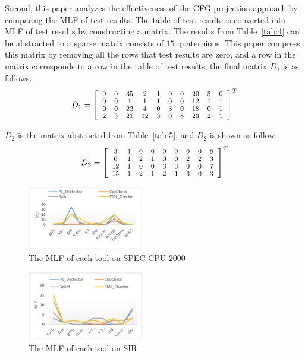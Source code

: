 Second, this paper analyzes the effectiveness of the CFG projection approach by comparing the MLF of test results. The table of test  results is converted into MLF of test results by constructing a matrix. The results from Table~\ref{tab:4} can be abstracted to a sparse matrix consists of $15$ quaternions. This paper compress this matrix by removing all the rows that test results are zero, and a row in the matrix corresponds to a row in the table of test results, the final matrix $D_1$ is as follows.
\[
\scriptsize
D_1=\left[
\begin{array}{cccccccccc}
0 & 0 & 35 & 2 & 1 & 0 & 0 & 20 & 3 & 0\\
0 & 0 & 1  &  1 & 1 & 0 & 0 & 12 & 1 & 1\\
0 & 0 & 22 & 4 & 0 & 3 & 0 & 18 & 0 & 1 \\
2 & 3 & 21 & 12 & 3& 0 & 8 & 20 & 2 & 1  
\end{array}
\right]^{T}
\]

$D_2$ is the matrix abstracted from Table~\ref{tab:5}, and $D_2$ is shown as follow:
\[
\scriptsize
D_2=\left[
\begin{array}{ccccccccc}
3 & 1 & 0 & 0 & 0 & 0 & 0 & 0 & 8 \\
6 & 1 & 2 &  1 & 0 & 0 & 2 & 2 & 3\\
12 & 1 & 0 & 0 & 3 & 3 & 0 & 0 & 7 \\
15 & 1 & 2& 1 & 2 & 1 & 3 & 0 & 3  
\end{array}
\right]^{T}
\]

\begin{figure}[!h]
\center
\includegraphics[width=0.45\textwidth]{figure/fig8-fig12/fig10}
\caption{The MLF of each tool on SPEC CPU 2000}
\label{fig:10}
\end{figure}

\begin{figure}[!h]
\center
\includegraphics[width=0.45\textwidth]{figure/fig8-fig12/fig11}
\caption{The MLF of each tool on SIR}
\label{fig:11}
\end{figure}

